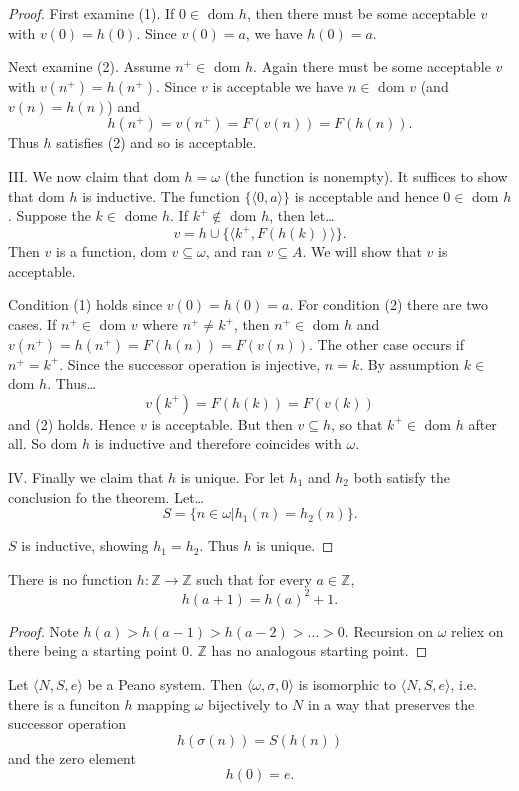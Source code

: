 \begin{proof}
First examine (1). If $0 \in$ dom $h$, then there must be some acceptable $v$ with $v(0) = h(0).$ Since $v(0) = a$, we have $h(0) = a$.

Next examine (2). Assume $n^+ \in$ dom $h$. Again there must be some acceptable $v$ with $v(n^+) = h(n^+)$. Since $v$ is acceptable we have $n \in$ dom $v$ (and $v(n) = h(n)$) and
$$h(n^+) = v(n^+) = F(v(n)) = F(h(n)).$$
Thus $h$ satisfies (2) and so is acceptable.\newline


III. We now claim that dom $h = \omega$ (the function is nonempty). It suffices to show that dom $h$ is inductive. The function $\{ \langle 0,a \rangle \}$ is acceptable and hence
$0 \in$ dom $h$. Suppose the $k \in$ dome $h$. If $k^+ \not\in$ dom $h$, then let\dots
$$v = h \cup \{ \langle k^+, F(h(k)) \rangle \}.$$
Then $v$ is a function, dom $v \subseteq \omega$, and ran $v \subseteq A$. We will show that $v$ is acceptable.

Condition (1) holds since $v(0) = h(0) = a.$ For condition (2) there are two cases. If $n^+ \in$ dom $v$ where $n^+ \neq k^+$, then $n^+ \in$ dom $h$ and $v(n^+) = h(n^+) = F(h(n)) = F(v(n)).$
The other case occurs if $n^+ = k^+$. Since the successor operation is injective, $n=k$. By assumption $k \in$ dom $h$. Thus\dots
$$v(k^+) = F(h(k)) = F(v(k))$$
and (2) holds. Hence $v$ is acceptable. But then $v \subseteq h$, so that $k^+ \in$ dom $h$ after all. So dom $h$ is inductive and therefore coincides with $\omega$.\newline


IV. Finally we claim that $h$ is unique. For let $h_1$ and $h_2$ both satisfy the conclusion fo the theorem. Let\dots
$$S = \{n \in \omega | h_1(n) = h_2(n) \}.$$

$S$ is inductive, showing $h_1 = h_2$. Thus $h$ is unique.
\end{proof}

\begin{example}
There is no function $h: \mathbb{Z} \rightarrow \mathbb{Z}$ such that for every $a \in \mathbb{Z}$,
$$h(a + 1) = h(a)^2 + 1.$$
\end{example}

\begin{proof}
Note $h(a) > h(a-1) > h(a-2) > \dots > 0.$  Recursion on $\omega$ reliex on there being a starting point $0$. $\mathbb{Z}$ has no analogous starting point.
\end{proof}

\begin{theorem}
Let $\langle N, S, e \rangle$ be a Peano system. Then $\langle \omega, \sigma, 0 \rangle$ is isomorphic to $\langle N, S, e \rangle$, i.e. there is a funciton $h$
mapping $\omega$ bijectively to $N$ in a way that preserves the successor operation
$$h(\sigma(n)) = S(h(n))$$
and the zero element
$$h(0) = e.$$
\end{theorem}



